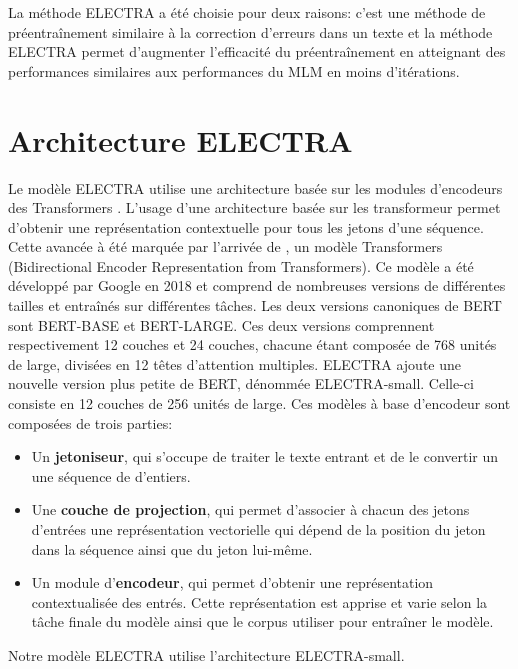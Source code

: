 \documentclass[12pt,twoside,maitrise]{dms}
\theoremstyle{definition}
\numberwithin{equation}{section}
\numberwithin{table}{chapter}
\numberwithin{figure}{chapter}
\begin{document}
La méthode ELECTRA a été choisie pour deux raisons: c'est une méthode de
préentraînement similaire à la correction d'erreurs dans un texte et la méthode
ELECTRA permet d'augmenter l'efficacité du préentraînement en atteignant des
performances similaires aux performances du MLM en moins d'itérations.


\section{Architecture ELECTRA}
Le modèle ELECTRA utilise une architecture basée sur les modules d'encodeurs
des Transformers \cite{vaswani2023attentionneed}. L'usage d'une architecture
basée sur les transformeur permet d'obtenir une représentation contextuelle
pour tous les jetons d'une séquence. Cette avancée à été marquée par l'arrivée
de \cite{bert},  un modèle Transformers (Bidirectional Encoder Representation
from Transformers). Ce modèle a été développé par Google en 2018 et comprend de
nombreuses versions de différentes tailles et entraînés sur différentes tâches.
Les deux versions canoniques de BERT sont BERT-BASE et BERT-LARGE. Ces deux
versions comprennent respectivement 12 couches et 24 couches, chacune étant
composée de 768 unités de large, divisées en 12 têtes d’attention multiples.
ELECTRA ajoute une nouvelle version plus petite de BERT, dénommée
ELECTRA-small. Celle-ci consiste en 12 couches de 256 unités de large. Ces
modèles à base d'encodeur sont composées de trois parties:
\begin{itemize}
    \item Un \textbf{jetoniseur}, qui s'occupe de traiter le texte entrant et
        de le convertir un une séquence de d'entiers.
    \item Une \textbf{couche de projection}, qui permet d'associer à chacun des
        jetons d'entrées une représentation vectorielle qui dépend de la
        position du jeton dans la séquence ainsi que du jeton lui-même.
    \item Un module d'\textbf{encodeur}, qui permet d'obtenir une
        représentation contextualisée des entrés. Cette représentation est
        apprise et varie selon la tâche finale du modèle ainsi que le corpus
        utiliser pour entraîner le modèle.
\end{itemize}
Notre modèle ELECTRA utilise l'architecture ELECTRA-small.
\end{document}
